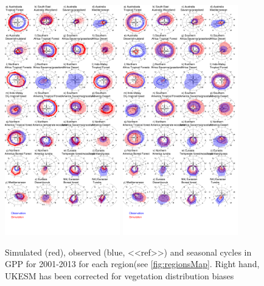 \begin{figure}[t]
        \includegraphics[width=5cm]{figs/GPP/fire_var_seasonality-TS-control-gpp.png}
        \includegraphics[width=5cm]{figs/GPP/fire_var_seasonality-TS-obsVegDist-gpp.png}
    
    \caption{Simulated (red), observed (blue, <<ref>>) and seasonal cycles in GPP for 2001-2013 for each region(see \ref{fig:regionsMap}. Right hand, UKESM has been corrected for vegetation distribution biases \label{fig:GPPseasonalTS}}
\end{figure}

